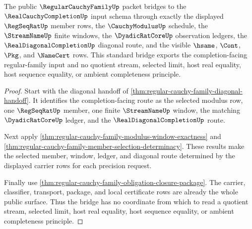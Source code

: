 \begin{theorem}
\label{thm:regular-cauchy-family-standard-bridge-boundary}
The public $\RegularCauchyFamilyUp$ packet bridges to the $\RealCauchyCompletionUp$ input schema through exactly the displayed $\RegSeqRatUp$ member rows, the $\CauchyModulusUp$ schedule, the $\StreamNameUp$ finite windows, the $\DyadicRatCoreUp$ observation ledgers, the $\RealDiagonalCompletionUp$ diagonal route, and the visible $\hsame$, $\Cont$, $\Pkg$, and $\NameCert$ rows. This standard bridge exports the completion-facing regular-family input and no quotient stream, selected limit, host real equality, host sequence equality, or ambient completeness principle.
\end{theorem}
\begin{proof}
Start with the diagonal handoff of \autoref{thm:regular-cauchy-family-diagonal-handoff}. It identifies the completion-facing route as the selected modulus row, one $\RegSeqRatUp$ member, one finite $\StreamNameUp$ window, the matching $\DyadicRatCoreUp$ ledger, and the $\RealDiagonalCompletionUp$ route.

Next apply \autoref{thm:regular-cauchy-family-modulus-window-exactness} and \autoref{thm:regular-cauchy-family-member-selection-determinacy}. These results make the selected member, window, ledger, and diagonal route determined by the displayed carrier rows for each precision request.

Finally use \autoref{thm:regular-cauchy-family-obligation-closure-package}. The carrier, classifier, transport, package, and local certificate rows are already the whole public surface. Thus the bridge has no coordinate from which to read a quotient stream, selected limit, host real equality, host sequence equality, or ambient completeness principle.
\end{proof}

